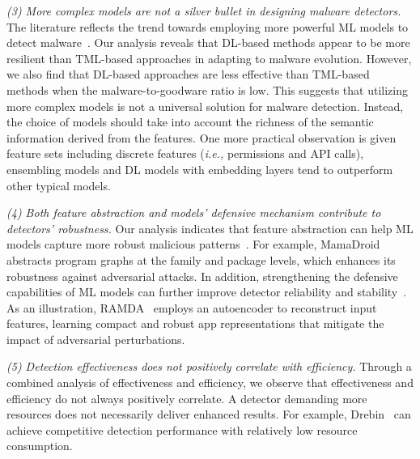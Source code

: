 \noindent \textit{(3) More complex models are not a silver bullet in designing malware detectors.}
The literature reflects the trend towards employing more powerful ML models to detect malware~\cite{xu2018deeprefiner,arp2014drebin}.
Our analysis reveals that DL-based methods appear to be more resilient than TML-based approaches in adapting to malware evolution.
However, we also find that DL-based approaches are less effective than TML-based methods when the malware-to-goodware ratio is low.
This suggests that utilizing more complex models is not a universal solution for malware detection.
Instead, the choice of models should take into account the richness of the semantic information derived from the features.
One more practical observation is given feature sets including discrete features (\textit{i.e.,} permissions and API calls), ensembling models and DL models with embedding layers tend to outperform other typical models.



\noindent \textit{(4) Both feature abstraction and models' defensive mechanism contribute to detectors' robustness.}
Our analysis indicates that feature abstraction can help ML models capture more robust malicious patterns~\cite{bhagoji2018enhancing}.
For example, MamaDroid~\cite{mariconti2016mamadroid} abstracts program graphs at the family and package levels, which enhances its robustness against adversarial attacks.
In addition, strengthening the defensive capabilities of ML models can further improve detector reliability and stability~\cite{papernot2016distillation}.
As an illustration, RAMDA~\cite{li2021robust} employs an autoencoder to reconstruct input features, learning compact and robust app representations that mitigate the impact of adversarial perturbations.

\noindent \textit{(5) Detection effectiveness does not positively correlate with efficiency.}
Through a combined analysis of effectiveness and efficiency, we observe that effectiveness and efficiency do not always positively correlate.
A detector demanding more resources does not necessarily deliver enhanced results.
For example, Drebin~\cite{arp2014drebin} can achieve competitive detection performance with relatively low resource consumption.


